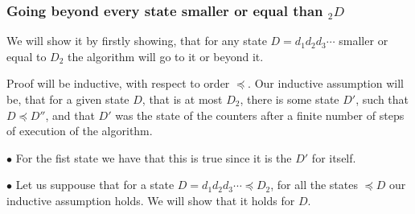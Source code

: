 \subsubsection{Going beyond every state smaller or equal than $_2D$}
We will show it by firstly showing, that for any state $D = d_1d_2d_3\cdots$ smaller 
or equal to  
$D_2$ the algorithm will go to it or beyond it.

Proof will be inductive, with respect to order $\preceq$. Our inductive assumption will be, that 
for a given state $D$, that is at most $D_2$, 
there is some state $D'$, such 
that $D\preceq D''$, and that $D'$ was the state of the counters after a finite 
number of steps of execution of the algorithm. 

$\bullet$ For the fist state we have that this is true since it is the $D'$ for itself.

$\bullet$ Let us suppouse that for a state $D = d_1d_2d_3\cdots \preceq D_2$, for  
all the states $\preceq D$ our inductive assumption holds. We will show that it holds 
for $D$. 
 
